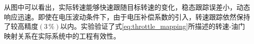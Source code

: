 从图中可以看出，实际转速能够快速跟随目标转速的变化，稳态跟踪误差小，动态响应迅速。即使在电压波动条件下，由于电压补偿系数的引入，转速跟踪依然保持了较高精度$(3\,\%)$以内。实验验证了式\eqref{eq:throttle_mapping}所描述的转速-油门映射关系在实际系统中的工程有效性。




